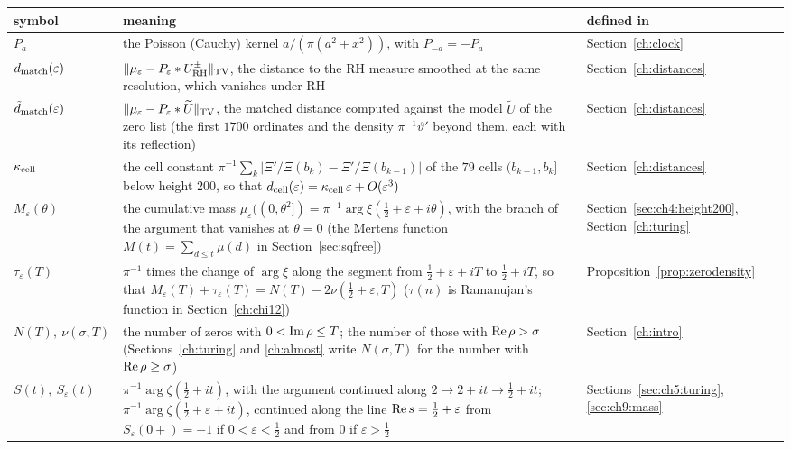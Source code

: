 {\small
\begin{longtable}{@{}p{}p{}p{}@{}}
\toprule
symbol & meaning & defined in\\
\midrule
\endhead
$P_a$ & \raggedright the Poisson (Cauchy) kernel $a/(\pi(a^2+x^2))$, with ${P_{-a}=-P_a}$ & \raggedright Section~\ref{ch:clock}\tabularnewline
$d_{\rm match}(\varepsilon)$ & \raggedright $\lVert \mu_\varepsilon-P_\varepsilon*U^\pm_{\mathrm{RH}}\rVert_{\mathrm{TV}}$, the distance to the RH measure smoothed at the same resolution, which vanishes under RH & \raggedright Section~\ref{ch:distances}\tabularnewline
$\tilde d_{\rm match}(\varepsilon)$ & \raggedright $\lVert \mu_\varepsilon-P_\varepsilon*\widetilde U\rVert_{\mathrm{TV}}$, the matched distance computed against the model $\widetilde U$ of the zero list (the first $1700$ ordinates and the density $\pi^{-1}\vartheta'$ beyond them, each with its reflection) & \raggedright Section~\ref{ch:distances}\tabularnewline
$\kappa_{\rm cell}$ & \raggedright the cell constant $\pi^{-1}\sum_k|\Xi'/\Xi(b_k)-\Xi'/\Xi(b_{k-1})|$ of the $79$ cells $(b_{k-1},b_k]$ below height $200$, so that $d_{\rm cell}(\varepsilon)=\kappa_{\rm cell}\,\varepsilon+O(\varepsilon^3)$ & \raggedright Section~\ref{ch:distances}\tabularnewline
$M_\varepsilon(\theta)$ & \raggedright the cumulative mass ${\mu_\varepsilon((0,\theta^2])=\pi^{-1}\arg\xi(\frac12+\varepsilon+i\theta)}$, with the branch of the argument that vanishes at $\theta=0$ (the Mertens function ${M(t)=\sum_{d\le t}\mu(d)}$ in Section~\ref{sec:sqfree}) & \raggedright Section~\ref{sec:ch4:height200}, Section~\ref{ch:turing}\tabularnewline
$\tau_\varepsilon(T)$ & \raggedright $\pi^{-1}$ times the change of $\arg\xi$ along the segment from ${\frac12+\varepsilon+iT}$ to ${\frac12+iT}$, so that ${M_\varepsilon(T)+\tau_\varepsilon(T)=N(T)-2\nu(\frac12+\varepsilon,T)}$ ($\tau(n)$ is Ramanujan's function in Section~\ref{ch:chi12}) & \raggedright Proposition~\ref{prop:zerodensity}\tabularnewline
$N(T),\ \nu(\sigma,T)$ & \raggedright the number of zeros with ${0<\operatorname{Im}\rho\le T}$; the number of those with $\operatorname{Re}\rho>\sigma$ (Sections~\ref{ch:turing} and \ref{ch:almost} write $N(\sigma,T)$ for the number with $\operatorname{Re}\rho\ge\sigma$) & \raggedright Section~\ref{ch:intro}\tabularnewline
$S(t),\ S_\varepsilon(t)$ & \raggedright $\pi^{-1}\arg\zeta(\frac12+it)$, with the argument continued along ${2\to2+it\to\frac12+it}$; $\pi^{-1}\arg\zeta(\frac12+\varepsilon+it)$, continued along the line ${\operatorname{Re} s=\frac12+\varepsilon}$ from ${S_\varepsilon(0+)=-1}$ if ${0<\varepsilon<\frac12}$ and from $0$ if ${\varepsilon>\frac12}$ & \raggedright Sections~\ref{sec:ch5:turing}, \ref{sec:ch9:mass}\tabularnewline

\end{longtable}}
